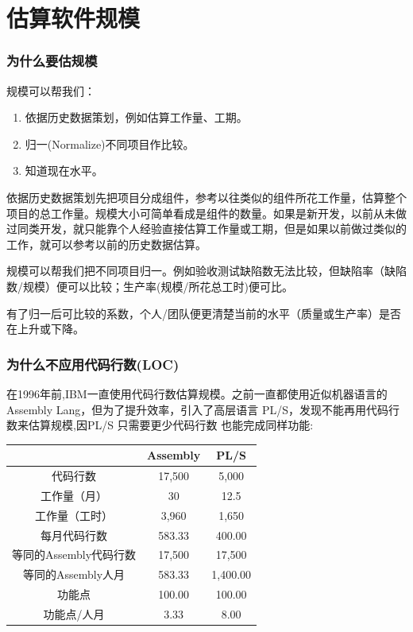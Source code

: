 \chapter{估算软件规模} %

\hypertarget{ux4e3aux4ec0ux4e48ux8981ux4f30ux89c4ux6a21}{%
\subsection{为什么要估规模}\label{ux4e3aux4ec0ux4e48ux8981ux4f30ux89c4ux6a21}}

规模可以帮我们：

\begin{enumerate}
\tightlist
\item
  依据历史数据策划，例如估算工作量、工期。
\item
  归一(Normalize)不同项目作比较。
\item
  知道现在水平。
\end{enumerate}

依据历史数据策划先把项目分成组件，参考以往类似的组件所花工作量，估算整个项目的总工作量。规模大小可简单看成是组件的数量。如果是新开发，以前从未做过同类开发，就只能靠个人经验直接估算工作量或工期，但是如果以前做过类似的工作，就可以参考以前的历史数据估算。

规模可以帮我们把不同项目归一。例如验收测试缺陷数无法比较，但缺陷率（缺陷数/规模）便可以比较；生产率(规模/所花总工时)便可比。

有了归一后可比较的系数，个人/团队便更清楚当前的水平（质量或生产率）是否在上升或下降。

\hypertarget{ux4e3aux4ec0ux4e48ux4e0dux5e94ux7528ux4ee3ux7801ux884cux6570loc}{%
\subsection{为什么不应用代码行数(LOC)}\label{ux4e3aux4ec0ux4e48ux4e0dux5e94ux7528ux4ee3ux7801ux884cux6570loc}}

在1996年前,IBM一直使用代码行数估算规模。之前一直都使用近似机器语言的Assembly
Lang，但为了提升效率，引入了高层语言
PL/S，发现不能再用代码行数来估算规模,因PL/S 只需要更少代码行数
也能完成同样功能:



\begin{tabular}{|c|c|c|}
\hline
\:&Assembly&PL/S\\
\hline
代码行数&17,500&5,000\\
\hline
工作量（月）&30&12.5\\
\hline
工作量（工时）&3,960&1,650\\
\hline
每月代码行数&583.33&400.00 \\
\hline
等同的Assembly代码行数&17,500&17,500\\
\hline
等同的Assembly人月&583.33&1,400.00\\
\hline
功能点&100.00&100.00\\
\hline
功能点/人月&3.33&8.00\\
\hline
\end{tabular}

